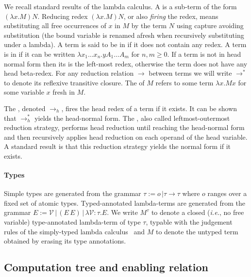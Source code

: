 \documentclass{elsarticle}
\makeatletter
\theoremstyle{plain}
\theoremstyle{definition}
\theoremstyle{remark}
\newcommand\VarSet{\mathcal{V}}
\renewcommand\ie{{\it i.e.\@\xspace}}
\makeatother
\begin{document}
We recall standard results of the lambda calculus.
A  is a sub-term of the form $(\lambda x. M) N$.
Reducing redex $(\lambda x. M) N$, or also \emph{firing} the redex, means substituting all free occurrences of $x$ in $M$ by the term $N$ using capture avoiding substitution (the bound variable is renamed afresh when recursively substituting under a lambda).
A term is said to be in  if it does not contain any redex.
A term is in  if it can be written $\lambda x_1 \ldots x_n . y A_1 \ldots A_m$ for $n,m\geq0$. If a term is not in head normal form then its  is the left-most redex, otherwise the term does not have any head beta-redex. For any reduction relation $\rightarrow$ between terms we will write $\rightarrow^*$ to denote its reflexive transitive closure. The  of $M$ refers to some term $\lambda x. M x $ for some variable $x$ fresh in $M$.

The , denoted $\rightarrow_{h}$, fires the head redex of a term if it exists. It can be shown that $\rightarrow^*_{h}$ yields the head-normal form. The , also called leftmost-outermost reduction strategy, performs head reduction until reaching the head-normal form and then recursively applies head reduction on each operand of the head variable. A standard result is that this reduction strategy yields the normal form if it exists.

\paragraph{Types} Simple types are generated from the grammar $\tau := o\, | \tau \rightarrow \tau$ where $o$ ranges over a fixed set of atomic types. Typed-annotated lambda-terms are generated from the grammar $E := \VarSet\, |\, (E\, E)\, |\, \lambda \VarSet \colon\tau. E $.
We write $M^\tau$ to denote a closed (\ie, no free variable)
type-annotated lambda-term of type $\tau$, typable with the judgement rules of the simply-typed lambda calculus~\cite{Barendregt84} and $M$ to denote the untyped term obtained by erasing its type annotations.

\subsection{Computation tree and enabling relation}
\end{document}
